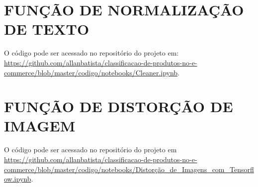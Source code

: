 \begin{apendicesenv}

\partapendices

\chapter{FUNÇÃO DE NORMALIZAÇÃO DE TEXTO}
\label{chap:funcao_normalizacao_texto}

O código pode ser acessado no repositório do projeto em:
\url{https://github.com/allanbatista/classificacao-de-produtos-no-e-commerce/blob/master/codigo/notebooks/Cleaner.ipynb}.

\chapter{FUNÇÃO DE DISTORÇÃO DE IMAGEM}
\label{chap:funcao_distorcao_imagem}

O código pode ser acessado no repositório do projeto em 
\url{https://github.com/allanbatista/classificacao-de-produtos-no-e-commerce/blob/master/codigo/notebooks/Distorção_de_Imagens_com_Tensorflow.ipynb}.


\end{apendicesenv}